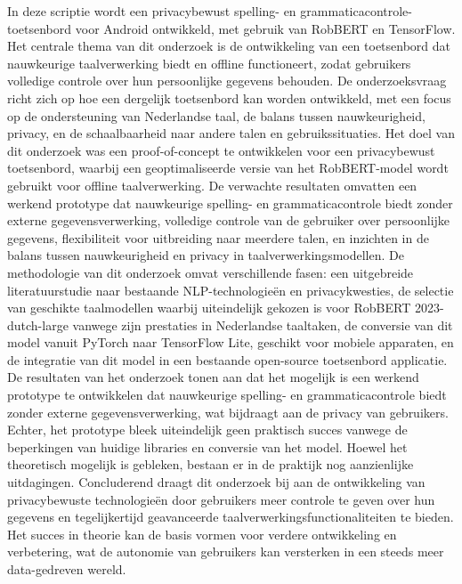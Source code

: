 In deze scriptie wordt een privacybewust spelling- en grammaticacontrole-toet\-sen\-bord voor Android ontwikkeld, met gebruik van RobBERT en TensorFlow. Het centrale thema van dit onderzoek is de ontwikkeling van een toetsenbord dat nauwkeurige taalverwerking biedt en offline functioneert, zodat gebruikers volledige controle over hun persoonlijke gegevens behouden. De onderzoeksvraag richt zich op hoe een dergelijk toetsenbord kan worden ontwikkeld, met een focus op de ondersteuning van Nederlandse taal, de balans tussen nauwkeurigheid, privacy, en de schaalbaarheid naar andere talen en gebruikssituaties.
Het doel van dit onderzoek was een proof-of-concept te ontwikkelen voor een privacybewust toetsenbord, waarbij een geoptimaliseerde versie van het RobBERT-model wordt gebruikt voor offline taalverwerking. De verwachte resultaten omvatten een werkend prototype dat nauwkeurige spelling- en grammaticacontrole biedt zonder externe gegevensverwerking, volledige controle van de gebruiker over persoonlijke gegevens, flexibiliteit voor uitbreiding naar meerdere talen, en inzichten in de balans tussen nauwkeurigheid en privacy in taalverwerkingsmodellen.
De methodologie van dit onderzoek omvat verschillende fasen: een uitgebreide literatuurstudie naar bestaande NLP-technologieën en privacykwesties, de selectie van geschikte taalmodellen waarbij uiteindelijk gekozen is voor RobBERT 2023-dutch-large vanwege zijn prestaties in Nederlandse taaltaken, de conversie van dit model vanuit PyTorch naar TensorFlow Lite, geschikt voor mobiele apparaten, en de integratie van dit model in een bestaande open-source toetsenbord applicatie.
De resultaten van het onderzoek tonen aan dat het mogelijk is een werkend prototype te ontwikkelen dat nauwkeurige spelling- en grammaticacontrole biedt zonder externe gegevensverwerking, wat bijdraagt aan de privacy van gebruikers. Echter, het prototype bleek uiteindelijk geen praktisch succes vanwege de beperkingen van huidige libraries en conversie van het model. Hoewel het theoretisch mogelijk is gebleken, bestaan er in de praktijk nog aanzienlijke uitdagingen.
Concluderend draagt dit onderzoek bij aan de ontwikkeling van privacybewuste technologieën door gebruikers meer controle te geven over hun gegevens en tegelijkertijd geavanceerde taalverwerkingsfunctionaliteiten te bieden. Het succes in theorie kan de basis vormen voor verdere ontwikkeling en verbetering, wat de autonomie van gebruikers kan versterken in een steeds meer data-gedreven wereld.
